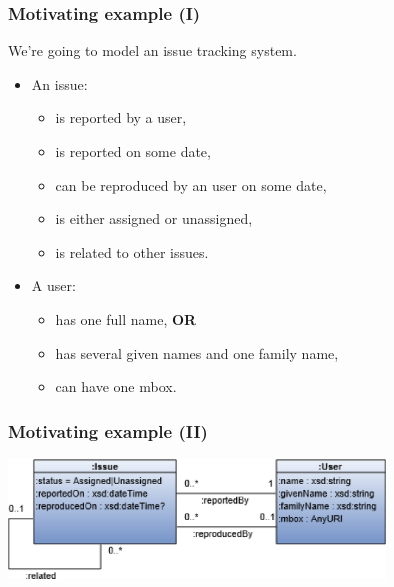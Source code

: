 \documentclass{beamer}
\begin{document}
\begin{frame}
  \frametitle{Motivating example (I)}

  We're going to model an issue tracking system.

  \pause

  \begin{itemize}
    \item An issue:

    \begin{itemize}
      \item is reported by a user,

      \pause

      \item is reported on some date,

      \pause

      \item can be reproduced by an user on some date,

      \pause

      \item is either assigned or unassigned,

      \pause

      \item is related to other issues.
    \end{itemize}

    \pause

    \item A user:

    \begin{itemize}
      \item has one full name, \textbf{OR}

      \pause

      \item has several given names and one family name,

      \pause

      \item can have one mbox.
    \end{itemize}
  \end{itemize}
\end{frame}

\begin{frame}
  \frametitle{Motivating example (II)}

  \begin{center}
    \includegraphics[width=10cm]{schema.png}
  \end{center}
\end{frame}
\end{document}
